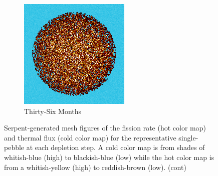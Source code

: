 \begin{figure}[H]
\begin{subfigure}{0.4\textwidth}
  \includegraphics[width=0.95\linewidth]{figures/burn-20-bstep6}
  \caption{Thirty-Six Months}
  \label{fig:bstep6}
\end{subfigure}%
%
\caption{Serpent-generated mesh figures of the fission rate (hot color map) and thermal flux (cold color map) for the representative single-pebble at each depletion step.  A cold color map is from shades of whitish-blue (high) to blackish-blue (low) while the hot color map is from a whitish-yellow (high) to reddish-brown (low). (cont)}
\label{fig:burn-meshes}
\end{figure}